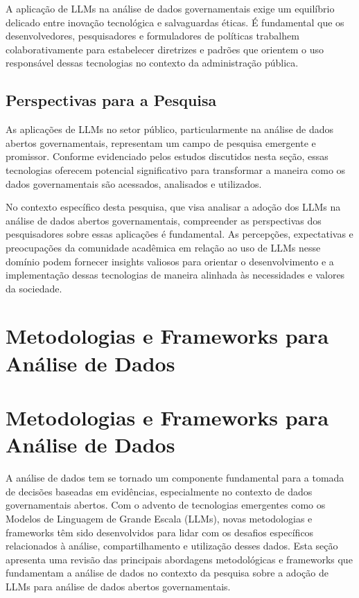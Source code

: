 A aplicação de LLMs na análise de dados governamentais exige um equilíbrio delicado entre inovação tecnológica e salvaguardas éticas. É fundamental que os desenvolvedores, pesquisadores e formuladores de políticas trabalhem colaborativamente para estabelecer diretrizes e padrões que orientem o uso responsável dessas tecnologias no contexto da administração pública.

\subsection{Perspectivas para a Pesquisa}

As aplicações de LLMs no setor público, particularmente na análise de dados abertos governamentais, representam um campo de pesquisa emergente e promissor. Conforme evidenciado pelos estudos discutidos nesta seção, essas tecnologias oferecem potencial significativo para transformar a maneira como os dados governamentais são acessados, analisados e utilizados.

No contexto específico desta pesquisa, que visa analisar a adoção dos LLMs na análise de dados abertos governamentais, compreender as perspectivas dos pesquisadores sobre essas aplicações é fundamental. As percepções, expectativas e preocupações da comunidade acadêmica em relação ao uso de LLMs nesse domínio podem fornecer insights valiosos para orientar o desenvolvimento e a implementação dessas tecnologias de maneira alinhada às necessidades e valores da sociedade.


\section{Metodologias e Frameworks para Análise de Dados}
\section{Metodologias e Frameworks para Análise de Dados}

A análise de dados tem se tornado um componente fundamental para a tomada de decisões baseadas em evidências, especialmente no contexto de dados governamentais abertos. Com o advento de tecnologias emergentes como os Modelos de Linguagem de Grande Escala (LLMs), novas metodologias e frameworks têm sido desenvolvidos para lidar com os desafios específicos relacionados à análise, compartilhamento e utilização desses dados. Esta seção apresenta uma revisão das principais abordagens metodológicas e frameworks que fundamentam a análise de dados no contexto da pesquisa sobre a adoção de LLMs para análise de dados abertos governamentais.


